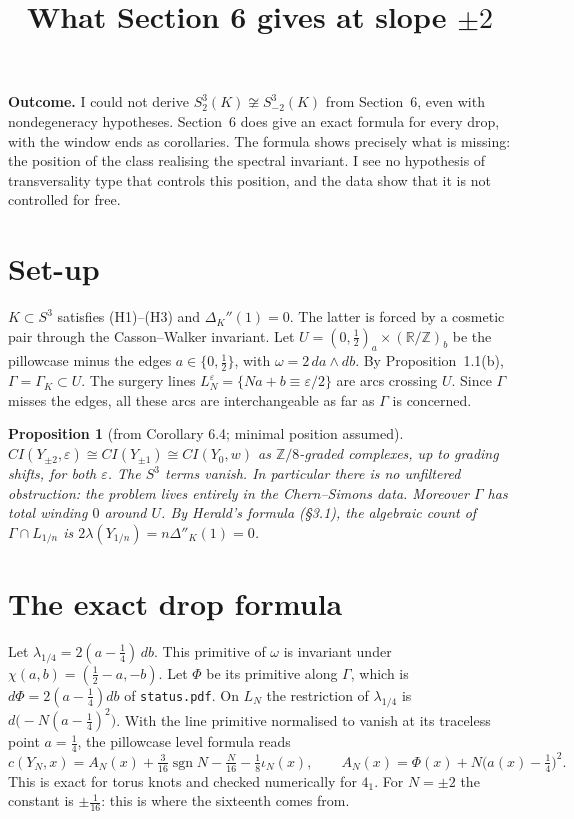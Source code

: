 \documentclass[10pt]{amsart}
\title{What Section 6 gives at slope $\pm2$}
\date{}
\newtheorem{prop}{Proposition}
\begin{document}
\sloppy
\maketitle
\vspace{-2.5em}

\noindent\textbf{Outcome.} I could not derive $S^3_2(K)\not\cong S^3_{-2}(K)$ from
Section~6, even with nondegeneracy hypotheses. Section~6 does give an exact
formula for every drop, with the window ends as corollaries. The formula shows
precisely what is missing: the position of the class realising the spectral
invariant. I see no hypothesis of transversality type that controls this position,
and the data show that it is not controlled for free.

\section{Set-up}

$K\subset S^3$ satisfies (H1)--(H3) and $\Delta_K''(1)=0$. The latter is forced by a
cosmetic pair through the Casson--Walker invariant. Let
$U=(0,\frac12)_a\times(\mathbb R/\mathbb Z)_b$ be the pillowcase minus the edges
$a\in\{0,\frac12\}$, with $\omega=2\,da\wedge db$. By Proposition~1.1(b),
$\Gamma=\Gamma_K\subset U$. The surgery lines $L_N^\varepsilon=\{Na+b\equiv\varepsilon/2\}$
are arcs crossing $U$. Since $\Gamma$ misses the edges, all these arcs are
interchangeable as far as $\Gamma$ is concerned.

\begin{prop}[from Corollary 6.4; minimal position assumed]
$CI(Y_{\pm2},\varepsilon)\cong CI(Y_{\pm1})\cong CI(Y_0,w)$ as $\mathbb Z/8$-graded
complexes, up to grading shifts, for both $\varepsilon$. The $S^3$ terms vanish. In
particular there is no unfiltered obstruction: the problem lives entirely in the
Chern--Simons data. Moreover $\Gamma$ has total winding $0$ around $U$. By Herald's formula (\S3.1),
the algebraic count of $\Gamma\cap L_{1/n}$ is $2\lambda(Y_{1/n})=n\Delta''_K(1)=0$.
\end{prop}

\section{The exact drop formula}

Let $\lambda_{1/4}=2(a-\frac14)\,db$. This primitive of $\omega$ is invariant under
$\chi(a,b)=(\frac12-a,-b)$. Let $\Phi$ be its primitive along $\Gamma$, which is
$d\Phi=2(a-\frac14)db$ of \texttt{status.pdf}. On $L_N$ the restriction of
$\lambda_{1/4}$ is $d\bigl(-N(a-\frac14)^2\bigr)$. With the line primitive normalised to
vanish at its traceless point $a=\frac14$, the pillowcase level formula reads
\[
c(Y_N,x)=A_N(x)+\tfrac3{16}\operatorname{sgn}N-\tfrac N{16}-\tfrac18\iota_N(x),\qquad
A_N(x)=\Phi(x)+N\bigl(a(x)-\tfrac14\bigr)^2 .
\]
This is exact for torus knots and checked numerically for $4_1$. For $N=\pm2$ the
constant is $\pm\frac1{16}$: this is where the sixteenth comes from.
\end{document}
